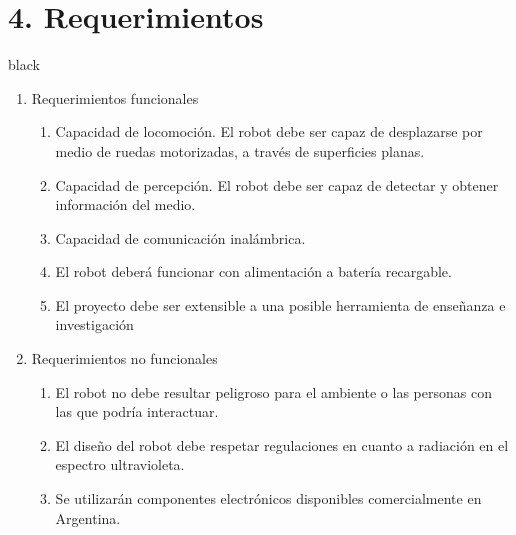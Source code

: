 \documentclass[11pt]{charter}
\begin{document}
\section{4. Requerimientos}
\label{sec:requerimientos}
\begin{consigna}{black}
\vspace{-12mm}
\begin{enumerate}
\item Requerimientos funcionales
	\begin{enumerate}
	\item Capacidad de locomoción.  El robot debe ser capaz de desplazarse por medio de ruedas motorizadas, a través de superficies planas.
	\item Capacidad de percepción. El robot debe ser capaz de detectar y obtener información del medio. 
	\item Capacidad de comunicación inalámbrica.
	\item El robot deberá funcionar con alimentación a batería recargable.
	\item El proyecto debe ser extensible a una posible herramienta de enseñanza e investigación

	\end{enumerate}
\item Requerimientos no funcionales
	\begin{enumerate}
	\item El robot no debe resultar peligroso para el ambiente o las personas con las que podría interactuar.
	\item El diseño del robot debe respetar regulaciones en cuanto a radiación en el espectro ultravioleta.
	\item Se utilizarán componentes electrónicos disponibles comercialmente en Argentina.
	\end{enumerate}
\end{enumerate}
\end{consigna}
\end{document}
